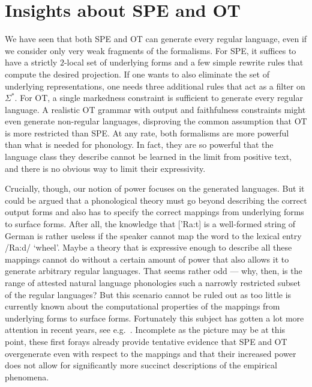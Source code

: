 \section{Insights about SPE and OT}
We have seen that both SPE and OT can generate every regular language, even if we consider only very weak fragments of the formalisms.
For SPE, it suffices to have a strictly $2$-local set of underlying forms and a few simple rewrite rules that compute the desired projection.
If one wants to also eliminate the set of underlying representations, one needs three additional rules that act as a filter on $\Sigma^*$.
For OT, a single markedness constraint is sufficient to generate every regular language.
A realistic OT grammar with output and faithfulness constraints might even generate non-regular languages, disproving the common assumption that OT is more restricted than SPE\@.
At any rate, both formalisms are more powerful than what is needed for phonology.
In fact, they are so powerful that the language class they describe cannot be learned in the limit from positive text, and there is no obvious way to limit their expressivity.

Crucially, though, our notion of power focuses on the generated languages.
But it could be argued that a phonological theory must go beyond describing the correct output forms and also has to specify the correct mappings from underlying forms to surface forms.
After all, the knowledge that ['Ra:t] is a well-formed string of German is rather useless if the speaker cannot map the word to the lexical entry /Ra:d/ `wheel'.
Maybe a theory that is expressive enough to describe all these mappings cannot do without a certain amount of power that also allows it to generate arbitrary regular languages.
That seems rather odd --- why, then, is the range of attested natural language phonologies such a narrowly restricted subset of the regular languages?
But this scenario cannot be ruled out as too little is currently known about the computational properties of the mappings from underlying forms to surface forms.
Fortunately this subject has gotten a lot more attention in recent years, see e.g.\ \citet{Chandlee14}.
Incomplete as the picture may be at this point, these first forays already provide tentative evidence that SPE and OT overgenerate even with respect to the mappings and that their increased power does not allow for significantly more succinct descriptions of the empirical phenomena.
